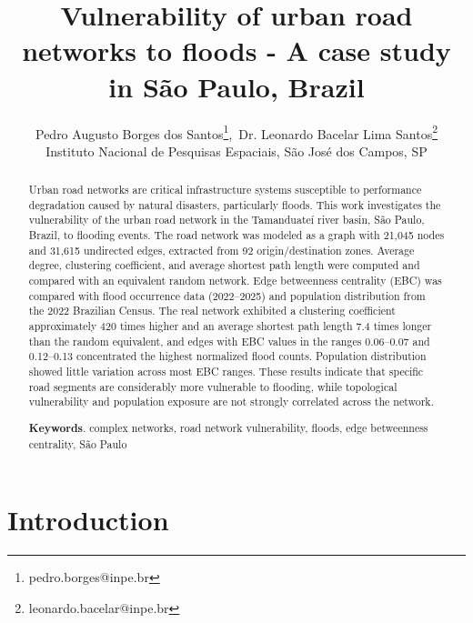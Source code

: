 \documentclass{pssbmac}
\begin{document}

\title{Vulnerability of urban road networks to floods - A case study in São Paulo, Brazil}

\author{
    {\large Pedro Augusto Borges dos Santos}\thanks{pedro.borges@inpe.br},\  {\large Dr. Leonardo Bacelar Lima Santos}\thanks{leonardo.bacelar@inpe.br}\\
    {\small Instituto Nacional de Pesquisas Espaciais, São José dos Campos, SP}
}
\criartitulo



\begin{abstract}

Urban road networks are critical infrastructure systems susceptible to performance degradation caused by natural disasters, particularly floods. This work investigates the vulnerability of the urban road network in the Tamanduate\'i river basin, S\~ao Paulo, Brazil, to flooding events. The road network was modeled as a graph with 21,045 nodes and 31,615 undirected edges, extracted from 92 origin/destination zones. Average degree, clustering coefficient, and average shortest path length were computed and compared with an equivalent random network. Edge betweenness centrality (EBC) was compared with flood occurrence data (2022--2025) and population distribution from the 2022 Brazilian Census. The real network exhibited a clustering coefficient approximately 420 times higher and an average shortest path length 7.4 times longer than the random equivalent, and edges with EBC values in the ranges 0.06--0.07 and 0.12--0.13 concentrated the highest normalized flood counts. Population distribution showed little variation across most EBC ranges. These results indicate that specific road segments are considerably more vulnerable to flooding, while topological vulnerability and population exposure are not strongly correlated across the network.

\noindent
{\bf Keywords}. complex networks, road network vulnerability, floods, edge betweenness centrality, S\~ao Paulo
\end{abstract}

\section{Introduction}
\end{document}
